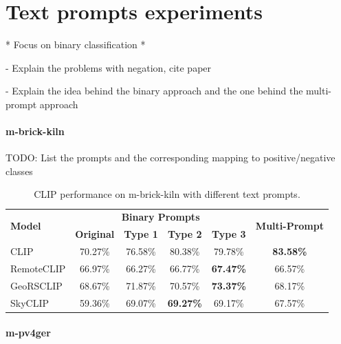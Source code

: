 \documentclass[a4paper, oneside, english]{sapthesis}
\begin{document}
\section{Text prompts experiments}

* Focus on binary classification *

- Explain the problems with negation, cite paper \cite{quantmeyer2024and}

- Explain the idea behind the binary approach and the one behind the multi-prompt approach

\paragraph{m-brick-kiln}

TODO: List the prompts and the corresponding mapping to positive/negative classes


\begin{table}[ht]
\centering
\footnotesize
\renewcommand{\arraystretch}{1.2}
    \begin{tabular}{lc|cccc}
    \toprule
    \multirow{2}{*}{\textbf{Model}} & \multicolumn{4}{c}{\textbf{Binary Prompts}} &  \multirow{2}{*}{\textbf{Multi-Prompt}}\\
    \cmidrule(lr){2-5}
    & \textbf{Original} & \textbf{Type 1} & \textbf{Type 2} & \textbf{Type 3} \\
    \midrule
    CLIP & 70.27\% & 76.58\% & 80.38\% & 79.78\% & \textbf{83.58\%} \\
    RemoteCLIP & 66.97\% & 66.27\% & 66.77\% & \textbf{67.47\%} & 66.57\% \\
    GeoRSCLIP & 68.67\% & 71.87\% & 70.57\% & \textbf{73.37\%} & 68.17\%\\
    SkyCLIP & 59.36\% & 69.07\% & \textbf{69.27\%} & 69.17\% & 67.57\% \\ 
    \bottomrule
    \end{tabular}
\vspace{0.3cm}
\caption{\normalsize CLIP performance on m-brick-kiln with different text prompts.}
\label{tab:prompts1}
\end{table}


\paragraph{m-pv4ger}
\end{document}
